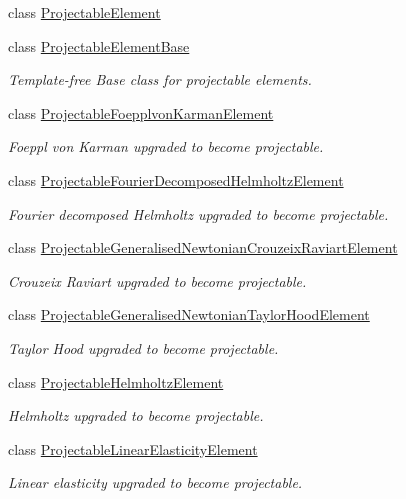 \begin{DoxyCompactItemize}
class \hyperlink{classoomph_1_1ProjectableElement}{Projectable\+Element}
\item 
class \hyperlink{classoomph_1_1ProjectableElementBase}{Projectable\+Element\+Base}
\begin{DoxyCompactList}\small\item\em Template-\/free Base class for projectable elements. \end{DoxyCompactList}\item 
class \hyperlink{classoomph_1_1ProjectableFoepplvonKarmanElement}{Projectable\+Foepplvon\+Karman\+Element}
\begin{DoxyCompactList}\small\item\em Foeppl von Karman upgraded to become projectable. \end{DoxyCompactList}\item 
class \hyperlink{classoomph_1_1ProjectableFourierDecomposedHelmholtzElement}{Projectable\+Fourier\+Decomposed\+Helmholtz\+Element}
\begin{DoxyCompactList}\small\item\em Fourier decomposed Helmholtz upgraded to become projectable. \end{DoxyCompactList}\item 
class \hyperlink{classoomph_1_1ProjectableGeneralisedNewtonianCrouzeixRaviartElement}{Projectable\+Generalised\+Newtonian\+Crouzeix\+Raviart\+Element}
\begin{DoxyCompactList}\small\item\em Crouzeix Raviart upgraded to become projectable. \end{DoxyCompactList}\item 
class \hyperlink{classoomph_1_1ProjectableGeneralisedNewtonianTaylorHoodElement}{Projectable\+Generalised\+Newtonian\+Taylor\+Hood\+Element}
\begin{DoxyCompactList}\small\item\em Taylor Hood upgraded to become projectable. \end{DoxyCompactList}\item 
class \hyperlink{classoomph_1_1ProjectableHelmholtzElement}{Projectable\+Helmholtz\+Element}
\begin{DoxyCompactList}\small\item\em Helmholtz upgraded to become projectable. \end{DoxyCompactList}\item 
class \hyperlink{classoomph_1_1ProjectableLinearElasticityElement}{Projectable\+Linear\+Elasticity\+Element}
\begin{DoxyCompactList}\small\item\em Linear elasticity upgraded to become projectable. \end{DoxyCompactList}\item 

\end{DoxyCompactItemize}
